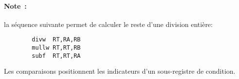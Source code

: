 \documentclass[10pt,twoside,a4paper]{article}
\begin{document}
\paragraph*{Note~: } la séquence suivante permet de calculer le reste d'une division entière: 


\begin{verbatim}
        divw  RT,RA,RB
        mullw RT,RT,RB
        subf  RT,RT,RA
\end{verbatim}

Les comparaisons positionnent les indicateurs d'un sous-registre de condition. 

\begin{tableinstr}
 \\
 \\
 \\

\end{tableinstr}
\end{document}
